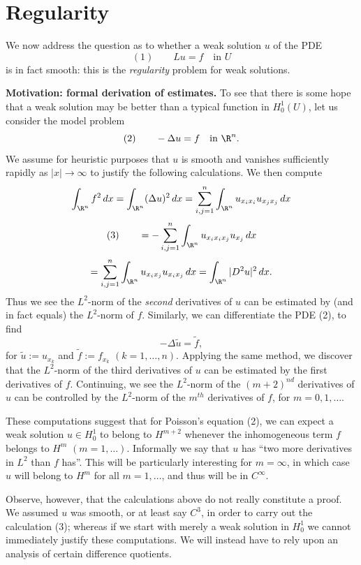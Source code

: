 \section{Regularity}
\label{sec:elliptic-regularity}

We now address the question as to whether a weak solution $u$ of the PDE
$$(1) \qquad Lu = f \quad \text{in } U$$
is in fact smooth: this is the \textit{regularity} problem for weak solutions.

\textbf{Motivation: formal derivation of estimates.} To see that there is some hope that a weak solution may be better than a typical function in $H_0^1(U)$, let us consider the model problem
$$(2) \qquad -\Delta u = f \quad \text{in } \R^n.$$
We assume for heuristic purposes that $u$ is smooth and vanishes sufficiently rapidly as $|x| \to \infty$ to justify the following calculations. We then compute
$$\int_{\R^n} f^2\,dx = \int_{\R^n}(\Delta u)^2\,dx = \sum_{i,j=1}^n \int_{\R^n} u_{x_ix_i}u_{x_jx_j}\,dx$$
$$(3) \qquad = -\sum_{i,j=1}^n \int_{\R^n} u_{x_ix_ix_j}u_{x_j}\,dx$$
$$= \sum_{i,j=1}^n \int_{\R^n} u_{x_ix_j}u_{x_ix_j}\,dx = \int_{\R^n}|D^2u|^2\,dx.$$
Thus we see the $L^2$-norm of the \textit{second} derivatives of $u$ can be estimated by (and in fact equals) the $L^2$-norm of $f$. Similarly, we can differentiate the PDE (2), to find
$$-\Delta\tilde u = \tilde f,$$
for $\tilde u := u_{x_k}$ and $\tilde f := f_{x_k}$ $(k=1,\ldots,n)$. Applying the same method, we discover that the $L^2$-norm of the third derivatives of $u$ can be estimated by the first derivatives of $f$. Continuing, we see the $L^2$-norm of the $(m+2)^{nd}$ derivatives of $u$ can be controlled by the $L^2$-norm of the $m^{th}$ derivatives of $f$, for $m = 0,1,\ldots$.

These computations suggest that for Poisson's equation (2), we can expect a weak solution $u \in H_0^1$ to belong to $H^{m+2}$ whenever the inhomogeneous term $f$ belongs to $H^m$ $(m=1,\ldots)$. Informally we say that $u$ has ``two more derivatives in $L^2$ than $f$ has''. This will be particularly interesting for $m = \infty$, in which case $u$ will belong to $H^m$ for all $m = 1,\ldots$, and thus will be in $C^\infty$.

Observe, however, that the calculations above do not really constitute a proof. We assumed $u$ was smooth, or at least say $C^3$, in order to carry out the calculation (3); whereas if we start with merely a weak solution in $H_0^1$ we cannot immediately justify these computations. We will instead have to rely upon an analysis of certain difference quotients.

